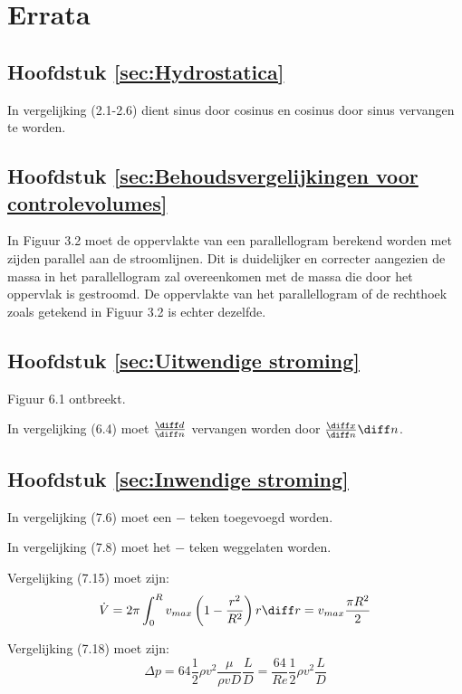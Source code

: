 \FloatBarrier
\chapter{Errata}
\label{sec:Errata}

\section{Hoofdstuk \ref{sec:Hydrostatica}}
In vergelijking (2.1-2.6) dient sinus door cosinus en cosinus door sinus vervangen te worden.

\section{Hoofdstuk \ref{sec:Behoudsvergelijkingen voor controlevolumes}}
In Figuur 3.2 moet de oppervlakte van een parallellogram berekend worden met zijden parallel aan de stroomlijnen. Dit is duidelijker en correcter aangezien de massa in het parallellogram zal overeenkomen met de massa die door het oppervlak is gestroomd. De oppervlakte van het parallellogram of de rechthoek zoals getekend in Figuur 3.2 is echter dezelfde.
\npar

\section{Hoofdstuk \ref{sec:Uitwendige stroming}}
Figuur 6.1 ontbreekt.

In vergelijking (6.4) moet $\frac{\diff d}{\diff n}$ vervangen worden door $\frac{\diff x}{\diff n}\diff n$.

\section{Hoofdstuk \ref{sec:Inwendige stroming}}
In vergelijking (7.6) moet een $-$ teken toegevoegd worden.

In vergelijking (7.8) moet het $-$ teken weggelaten worden.

Vergelijking (7.15) moet zijn:
\begin{equation}
	\dot{V} = 2 \pi \int_0^R v_{max}\left(1-\frac{r^2}{R^2}\right) r \diff r = v_{max} \frac{\pi R^2}{2} \nonumber
\end{equation}

Vergelijking (7.18) moet zijn:
\begin{equation}
	\Delta p = 64 \frac{1}{2} \rho v^2 \frac{\mu}{\rho v D} \frac{L}{D} = \frac{64}{Re} \frac{1}{2} \rho v^2 \frac{L}{D}
\end{equation}